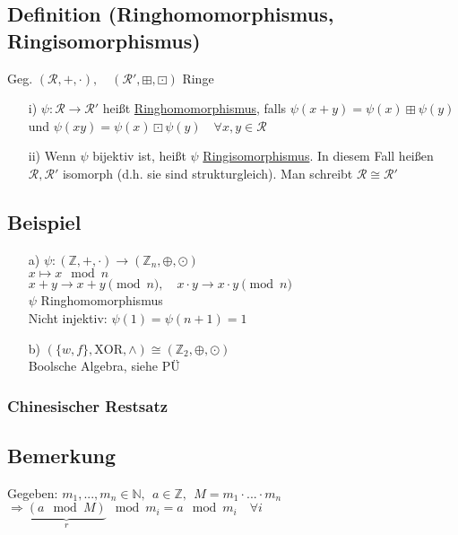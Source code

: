\documentclass[12pt,titlepage, pdf]{article}
\newcommand{\uline}[1]{\underline{#1}}
\renewcommand{\>}{\rightarrow}
\renewcommand{\*}{\cdot}
\begin{document}
	      \subsection{Definition (Ringhomomorphismus, Ringisomorphismus)}
	      Geg. $(\mathcal{R}, + , \cdot),\quad (\mathcal{R}', \boxplus, \boxdot)$  Ringe
	      \begin{itemize}
	      	\item[i)]$\psi: \mathcal{R} \rightarrow \mathcal{R}'$ heißt \uline{Ringhomomorphismus}, falls $\psi(x+y) = \psi(x) \boxplus \psi(y)$ und $\psi(xy)= \psi(x) \boxdot \psi(y)\quad \forall x,y \in \mathcal{R}$
	      	\item[ii)] Wenn $\psi$ bijektiv ist, heißt $\psi$ \uline{Ringisomorphismus}. In diesem Fall heißen $\mathcal{R}, \mathcal{R}'$ isomorph (d.h. sie sind strukturgleich). Man schreibt $\mathcal{R} \cong \mathcal{R}'$
	      \end{itemize}
	      	
	      \subsection{Beispiel}
	      \begin{itemize}
	      	\item[a)] $\psi: (\mathds{Z}, + ,\cdot) \rightarrow (\mathds{Z}_n,\oplus, \odot)$\\
	      	      \noindent\hspace*{17mm}$x \mapsto x \mod n$\\
	      	      $x +y \rightarrow x+y \pmod{n},\quad x \cdot y \rightarrow x \cdot y \pmod{n}$\\
	      	      $\psi$ Ringhomomorphismus\\
	      	      Nicht injektiv: $\psi(1)=\psi(n+1)=1$
	      	\item[b)]  $(\{w,f\}, \text{XOR}, \land) \cong (\mathds{Z}_2, \oplus, \odot)$\\
	      	      Boolsche Algebra, siehe PÜ
	      \end{itemize}
	      \subsubsection*{Chinesischer Restsatz}
	      \subsection{Bemerkung}
	      \label{4.10}
	      Gegeben: $m_1,...,m_n \in \mathds{N},~~ a \in \mathds{Z},~~ M = m_1 \cdot ... \cdot m_n$ \\
	      \noindent\hspace*{11mm}$\Rightarrow\underbrace{(a \mod M)}_{r} \mod m_i = a \mod m_i \quad\forall i$
\end{document}
